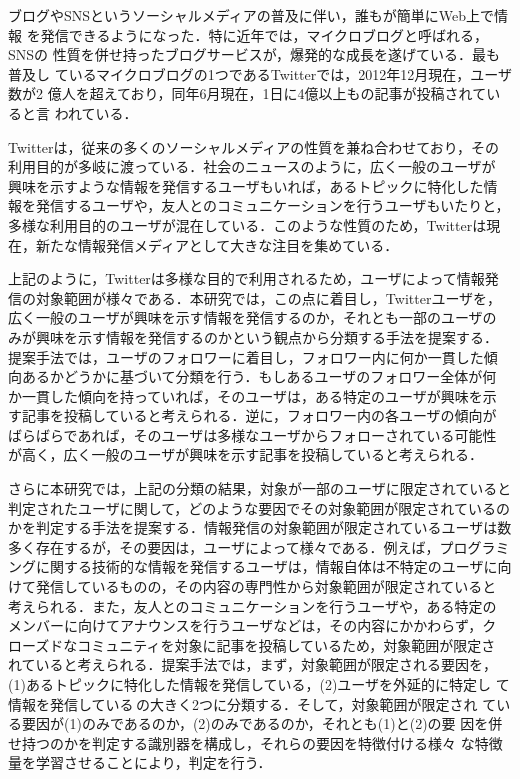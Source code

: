 \begin{jabstract}
ブログやSNSというソーシャルメディアの普及に伴い，誰もが簡単にWeb上で情報
 を発信できるようになった．特に近年では，マイクロブログと呼ばれる，SNSの
 性質を併せ持ったブログサービスが，爆発的な成長を遂げている．最も普及し
 ているマイクロブログの1つであるTwitterでは，2012年12月現在，ユーザ数が2
 億人を超えており，同年6月現在，1日に4億以上もの記事が投稿されていると言
 われている．

Twitterは，従来の多くのソーシャルメディアの性質を兼ね合わせており，その
 利用目的が多岐に渡っている．社会のニュースのように，広く一般のユーザが
 興味を示すような情報を発信するユーザもいれば，あるトピックに特化した情
 報を発信するユーザや，友人とのコミュニケーションを行うユーザもいたりと，
 多様な利用目的のユーザが混在している．このような性質のため，Twitterは現
 在，新たな情報発信メディアとして大きな注目を集めている．

上記のように，Twitterは多様な目的で利用されるため，ユーザによって情報発
 信の対象範囲が様々である．本研究では，この点に着目し，Twitterユーザを，
 広く一般のユーザが興味を示す情報を発信するのか，それとも一部のユーザの
 みが興味を示す情報を発信するのかという観点から分類する手法を提案する．
 提案手法では，ユーザのフォロワーに着目し，フォロワー内に何か一貫した傾
 向あるかどうかに基づいて分類を行う．もしあるユーザのフォロワー全体が何
 か一貫した傾向を持っていれば，そのユーザは，ある特定のユーザが興味を示
 す記事を投稿していると考えられる．逆に，フォロワー内の各ユーザの傾向が
 ばらばらであれば，そのユーザは多様なユーザからフォローされている可能性
 が高く，広く一般のユーザが興味を示す記事を投稿していると考えられる．

さらに本研究では，上記の分類の結果，対象が一部のユーザに限定されていると
 判定されたユーザに関して，どのような要因でその対象範囲が限定されているの
 かを判定する手法を提案する．情報発信の対象範囲が限定されているユーザは数
 多く存在するが，その要因は，ユーザによって様々である．例えば，プログラミ
 ングに関する技術的な情報を発信するユーザは，情報自体は不特定のユーザに向
 けて発信しているものの，その内容の専門性から対象範囲が限定されていると
 考えられる．また，友人とのコミュニケーションを行うユーザや，ある特定の
 メンバーに向けてアナウンスを行うユーザなどは，その内容にかかわらず，ク
 ローズドなコミュニティを対象に記事を投稿しているため，対象範囲が限定さ
 れていると考えられる．提案手法では，まず，対象範囲が限定される要因を，
 (1)あるトピックに特化した情報を発信している，(2)ユーザを外延的に特定し
 て情報を発信している\,の大きく2つに分類する．そして，対象範囲が限定され
 ている要因が(1)のみであるのか，(2)のみであるのか，それとも(1)と(2)の要
 因を併せ持つのかを判定する識別器を構成し，それらの要因を特徴付ける様々
 な特徴量を学習させることにより，判定を行う．


\end{jabstract}
